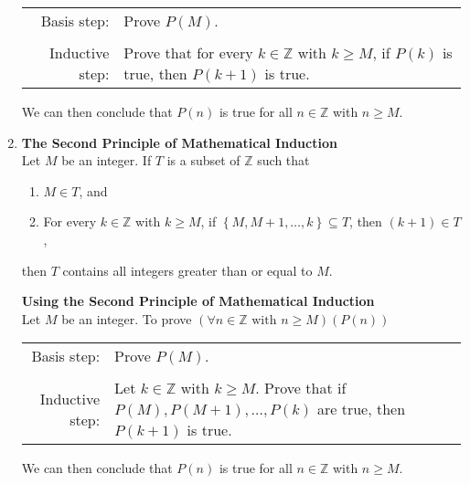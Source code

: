 \begin{enumerate}
\begin{tabular}{r p{3in}}
 Basis step:    &  Prove  $P( M )$. \\
                &                              \\
Inductive step: &	 Prove that for every  $k \in \mathbb{Z} $ with $k \geq M$, if  $P( k )$ is true, then  $P( {k + 1})$ is true. \\
\end{tabular}

We can then conclude that  $P( n )$ is true for all  $n \in \mathbb{Z}$ with  
$n \geq M$\!.

\item \textbf{The Second Principle of Mathematical Induction} \\
%
%
Let  $M$  be an integer.  If  $T$  is a subset of  $\mathbb{Z}$ such that
\begin{enumerate}
  \item $M \in T$\!, and

  \item For every  $k \in \mathbb{Z}$ with $k \geq M$\!, if  
$\left\{ {M, M + 1, \ldots ,k} \right\} \subseteq T$\!, then  $\left( {k + 1} \right) \in T$\!,
\end{enumerate}

then  $T$  contains all integers greater than or equal to  $M$\!.  

\textbf{Using the Second Principle of Mathematical Induction} \\
Let  $M$  be an integer.  To prove 
$\left( {\forall n \in \mathbb{Z} \text{ with } n \geq M} \right)\left( {P( n )} \right)$

\begin{tabular}{r p{3in}}
Basis step:    &  Prove  $P( M )$. \\
                &                              \\
Inductive step: &	 Let  $k \in \mathbb{Z}$ with  $k \geq M$.  Prove that if $P( M ),P( {M + 1} ), \ldots ,P( k )$ are true, then  $P( {k + 1} )$ is true. \\
\end{tabular}

We can then conclude that  $P( n )$ is true for all  $n \in \mathbb{Z}$ with  $n \geq M$.
\end{enumerate}
\hbreak

